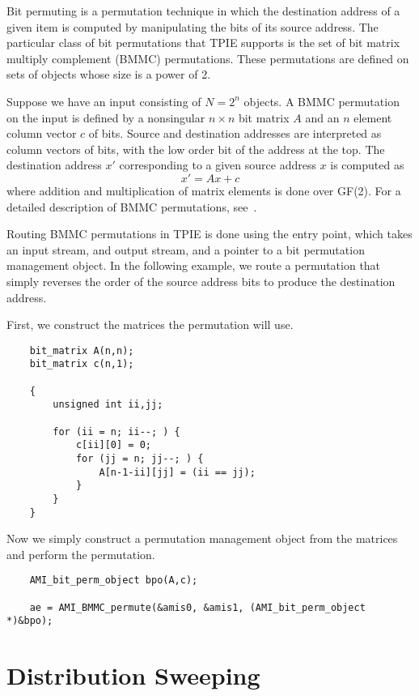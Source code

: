 
Bit permuting is a permutation technique in which the destination address
of a given item is computed by manipulating the bits of its source address.
The particular class of bit permutations that TPIE supports is the set of
bit matrix multiply complement (BMMC) permutations.  These permutations are
defined on sets of objects whose size is a power of 2.

Suppose we have an input consisting of $N = 2^n$ objects.  A BMMC
permutation on the input is defined by a nonsingular $n \times n$ bit
matrix $A$ and an $n$ element column vector $c$ of bits.  Source and
destination addresses are interpreted as column vectors of bits, with
the low order bit of the address at the top. The destination address
$x'$ corresponding to a given source address $x$ is computed as
$$x' = Ax + c$$ where addition and multiplication of matrix elements is
done over GF(2). For a detailed description of BMMC permutations,
see~\cite{cormen:integrate-tr}.

Routing BMMC permutations in TPIE is done using the
 entry point, which takes an input stream, and output stream, and a
pointer to a bit permutation management object. In the following example,
we route a permutation that simply reverses the order of the source address
bits to produce the destination address.

First, we construct the matrices the permutation will use.
\begin{verbatim}
    bit_matrix A(n,n);
    bit_matrix c(n,1);

    {
        unsigned int ii,jj;

        for (ii = n; ii--; ) {
            c[ii][0] = 0;
            for (jj = n; jj--; ) {
                A[n-1-ii][jj] = (ii == jj);
            }
        }
    }
\end{verbatim}
Now we simply construct a permutation management object from the
matrices and perform the permutation.
\begin{verbatim}
    AMI_bit_perm_object bpo(A,c);
    
    ae = AMI_BMMC_permute(&amis0, &amis1, (AMI_bit_perm_object *)&bpo);
\end{verbatim}

\section{Distribution Sweeping} \label{sec:distsweep}

